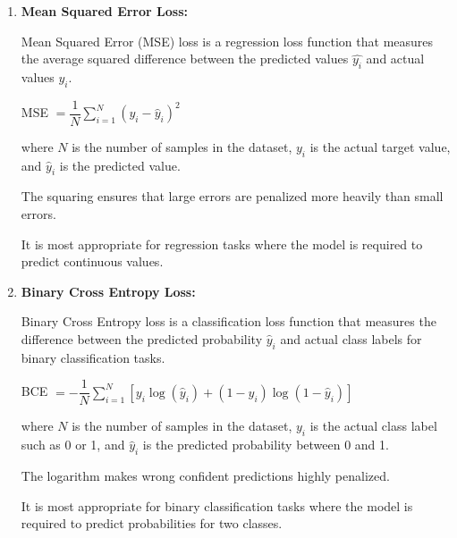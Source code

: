 \documentclass[12pt,letterpaper, onecolumn]{exam}
\begin{document}
\begin{questions}
\begin{parts}
        \begin{solution}

            \begin{enumerate}[label=(\alph*)]
                \item \textbf{Mean Squared Error Loss:}
                
                Mean Squared Error (MSE) loss is a regression loss function that measures the average squared difference between the predicted values $\hat{y_i}$ and actual values $y_i$.
                
                \begin{center}
                    MSE $\displaystyle{= \dfrac{1}{N} \sum_{i=1}^{N} (y_i - \hat{y}_i)^2}$
                \end{center}

                where $N$ is the number of samples in the dataset, $y_i$ is the actual target value, and $\hat{y}_i$ is the predicted value.

                The squaring ensures that large errors are penalized more heavily than small errors.

                It is most appropriate for regression tasks where the model is required to predict continuous values.
                
                \item \textbf{Binary Cross Entropy Loss:}
                
                Binary Cross Entropy loss is a classification loss function that measures the difference between the predicted probability $\hat{y}_i$ and actual class labels for binary classification tasks.
                
                \begin{center}
                    BCE $\displaystyle{= -\dfrac{1}{N} \sum_{i=1}^{N} [y_i \log(\hat{y}_i) + (1 - y_i) \log(1 - \hat{y}_i)]}$
                \end{center}

                where $N$ is the number of samples in the dataset, $y_i$ is the actual class label such as 0 or 1, and $\hat{y}_i$ is the predicted probability between 0 and 1.

                The logarithm makes wrong confident predictions highly penalized.

                It is most appropriate for binary classification tasks where the model is required to predict probabilities for two classes. 
                

\end{enumerate}
\end{solution}
\end{parts}
\end{questions}
\end{document}
